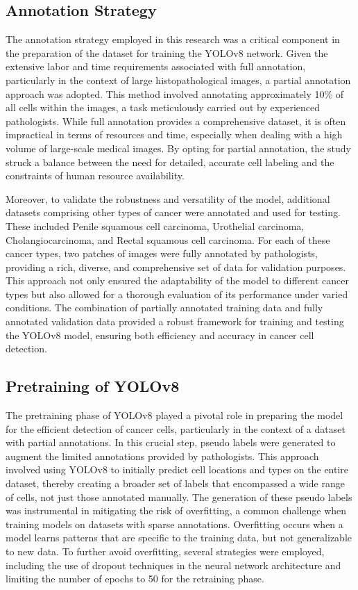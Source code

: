 \documentclass[anon]{midl} %
\begin{document}
\subsection{Annotation Strategy}
The annotation strategy employed in this research was a critical component in the preparation of the dataset for training the YOLOv8 network. Given the extensive labor and time requirements associated with full annotation, particularly in the context of large histopathological images, a partial annotation approach was adopted. This method involved annotating approximately 10\% of all cells within the images, a task meticulously carried out by experienced pathologists. While full annotation provides a comprehensive dataset, it is often impractical in terms of resources and time, especially when dealing with a high volume of large-scale medical images. By opting for partial annotation, the study struck a balance between the need for detailed, accurate cell labeling and the constraints of human resource availability.

Moreover, to validate the robustness and versatility of the model, additional datasets comprising other types of cancer were annotated and used for testing. These included Penile squamous cell carcinoma, Urothelial carcinoma, Cholangiocarcinoma, and Rectal squamous cell carcinoma. For each of these cancer types, two patches of images were fully annotated by pathologists, providing a rich, diverse, and comprehensive set of data for validation purposes. This approach not only ensured the adaptability of the model to different cancer types but also allowed for a thorough evaluation of its performance under varied conditions. The combination of partially annotated training data and fully annotated validation data provided a robust framework for training and testing the YOLOv8 model, ensuring both efficiency and accuracy in cancer cell detection.

\subsection{Pretraining of YOLOv8}
The pretraining phase of YOLOv8 played a pivotal role in preparing the model for the efficient detection of cancer cells, particularly in the context of a dataset with partial annotations. In this crucial step, pseudo labels were generated to augment the limited annotations provided by pathologists. This approach involved using YOLOv8 to initially predict cell locations and types on the entire dataset, thereby creating a broader set of labels that encompassed a wide range of cells, not just those annotated manually. The generation of these pseudo labels was instrumental in mitigating the risk of overfitting, a common challenge when training models on datasets with sparse annotations. Overfitting occurs when a model learns patterns that are specific to the training data, but not generalizable to new data. To further avoid overfitting, several strategies were employed, including the use of dropout techniques in the neural network architecture and limiting the number of epochs to 50 for the retraining phase.
\end{document}
